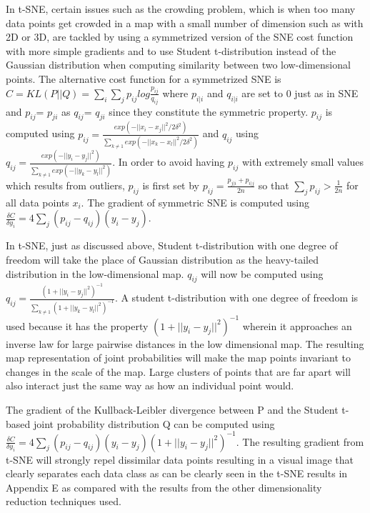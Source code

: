 In t-SNE, certain issues such as the crowding problem, which is when too many data points get crowded in a map with a small number of dimension such as with 2D or 3D, are tackled by using a symmetrized version of the SNE cost function with more simple gradients and to use Student t-distribution instead of the Gaussian distribution when computing similarity between two low-dimensional points. The alternative cost function for a symmetrized SNE is $C=KL(P||Q) = \sum_{i}\sum_{j} p_{ij}log\frac {p_{ij}}{q_{ij}}$ where $p_{i|i}$ and $q_{i|i}$ are set to 0 just as in SNE and $p_{ij}$= $p_{ji}$ as $q_{ij}$= $q_{ji}$ since they constitute the symmetric property. $p_{ij}$ is computed using $p_{ij} = \frac{exp(-||x_i - x_j||^2 / 2 \delta ^2 )}{\sum_{k \neq 1}exp(-||x_k - x_l||^2 / 2 \delta ^2 )}$ and $q_{ij}$ using $q_{ij} = \frac{exp(-||y_i - y_j||^2)}{\sum_{k \neq 1}exp(-||y_k - y_l||^2)}$. In order to avoid having $p_{ij}$ with extremely small values which results from outliers, $p_{ij}$ is first set by $p_{ij} = \frac{p_{j|i} + p_{i|j}}{2n}$ so that $\sum_j p_{ij} > \frac{1}{2n}$ for all data points $x_i$. The gradient of symmetric SNE is computed using $\frac{\delta C}{\delta y_i} = 4 \sum_j (p_{ij} - q_{ij})(y_i - y_j)$.

In t-SNE, just as discussed above, Student t-distribution with one degree of freedom will take the place of Gaussian distribution as the heavy-tailed distribution in the low-dimensional map. $q_{ij}$ will now be computed using $q_{ij} = \frac{(1+||y_i - y_j||^2)^{-1}}{\sum_{k \neq 1} (1+||y_k - y_l||^2)^{-1}} $. A student t-distribution with one degree of freedom is used because it has the property $(1+||y_i - y_j||^2)^{-1}$  wherein it  approaches an inverse law for large pairwise distances in the low dimensional map. The resulting map representation of joint probabilities will make the map points invariant to changes in the scale of the map. Large clusters of points that are far apart will also interact just the same way as how an individual point would.

The gradient of the Kullback-Leibler divergence between P and the Student t-based joint probability distribution Q can be computed using $\frac{\delta C}{\delta y_i} = 4\sum_j (p_{ij} - q_{ij})(y_i - y_j)(1+||y_i - y_j||^2)^{-1}$. The resulting gradient from t-SNE will strongly repel dissimilar data points resulting in a visual image that clearly separates each data class as can be clearly seen in the t-SNE results in Appendix E as compared with the results from the other dimensionality reduction techniques used.

